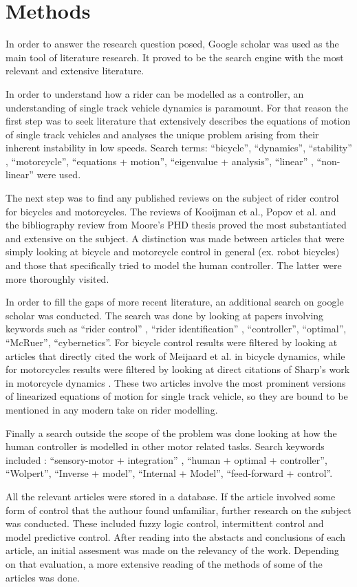 \chapter{Methods}
\label{methods}


In order to answer the research question posed, Google scholar was  used as the main tool of literature research. It proved to be the search engine with the most relevant and extensive literature.


In order to understand how a rider can be modelled as a controller, an understanding of single track vehicle dynamics is paramount. For that reason the first step was to seek literature that extensively describes the equations of motion of single track vehicles and analyses the unique problem arising from their inherent instability in low speeds. Search terms: “bicycle”, “dynamics”, “stability” , “motorcycle”, “equations + motion”, “eigenvalue + analysis”, “linear” , “non-linear”  were used.


\par
The next step was to find any published reviews on the subject of rider control for bicycles and motorcycles. The reviews of Kooijman et al.\cite{kooijman2013review}, Popov et al.\cite{popov2010review} and the bibliography review from Moore’s PHD thesis \cite{moore2012human} proved the most substantiated and extensive on the subject. A distinction was made between articles that were simply looking at bicycle and motorcycle control in general (ex. robot bicycles) and those that specifically tried to model the human controller. The latter  were more thoroughly visited. 

\par
In order to fill the gaps of more recent literature, an additional search on google scholar was conducted. The search was done by looking at papers involving keywords such as “rider control” , “rider identification” , “controller”, “optimal”, “McRuer”, “cybernetics”. For bicycle control results were filtered by looking at articles that directly cited the work of Meijaard et al. \cite{meijaard2007linearized} in bicycle dynamics, while for motorcycles results were filtered by looking at direct citations of Sharp’s work in motorcycle dynamics \cite{sharp1971stability}. These two articles involve the most prominent versions of linearized equations of motion for single track vehicle, so they are bound to be mentioned in any modern take on rider modelling.

Finally a search outside the scope of the problem was done looking at how the human controller is modelled in other motor related tasks. Search keywords included : “sensory-motor + integration” , “human + optimal + controller”, “Wolpert”, “Inverse + model”, “Internal + Model”, “feed-forward + control”.

All the relevant articles were stored in a database. If the article involved some form of control that the authour found unfamiliar, further research on the subject was conducted. These included fuzzy logic control, intermittent control and  model predictive control. After reading into the abstacts and conclusions of each article, an initial assesment was made on the relevancy of the work. Depending on that evaluation, a more extensive reading of the methods of some of the articles was done.